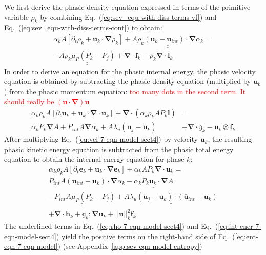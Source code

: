 \documentclass[preprint,10pt]{elsarticle}
\renewcommand{\div}{\mbold{\nabla}\! \cdot \!}
\newcommand{\grad}{\mbold{\nabla}}
\newcommand{\mbold}[1]{\boldsymbol#1}
\newcommand{\eqt}[1]{Eq.~(\ref{#1})}                     %
\newcommand{\app}[1]{Appendix~\ref{#1}}                   %
\newcommand{\tcr}[1]{\textcolor{red}{#1}}
\begin{document}
%
We first derive the phasic density equation expressed in terms of the primitive variable $\rho_k$ by combining \eqt{eq:sev_equ-with-diss-terms-vf} and \eqt{eq:sev_equ-with-diss-terms-cont} to obtain:
%
\begin{multline}\label{eq:rho-7-eqn-model-sect4}
\alpha_k A \left[ \partial_t \rho_k + \mbold u_k  \cdot \grad \rho_k \right] +  \underline{\underline{ A \rho_k \left( \mbold u_k - \mbold u_{int} \right) \cdot \grad \alpha_k}} = \\-\underline{\underline{A \rho_k \mu_P \left( P_k - P_j \right)}} + \div \mbold f_k - \rho_k \div \mbold l_k
\end{multline}
%
In order to derive an equation for the phasic internal energy, the phasic velocity equation is obtained by subtracting the phasic density equation (multiplied by $\mbold u_k$) from the phasic momentum equation:
%
\tcr{too many dots in the second term. It should really be $(\mbold u \cdot \grad) \mbold u$}
\begin{align}\label{eq:vel-7-eqn-model-sect4}
\alpha_k \rho_k  A \left[ \partial_t \mbold u_k + \mbold u_k \cdot \div \mbold u_k \right]  + \div \left( \alpha_k \rho_k A P_k \mathbb{I} \right) &=\nonumber\\
\alpha_k P_k \grad A + P_{int} A \grad \alpha_k + A \lambda_u \left( \mbold u_j - \mbold u_k \right) &+ \div \mathbb{g}_k - \mbold u_k \otimes \mbold f_k
\end{align}
%
After multiplying \eqt{eq:vel-7-eqn-model-sect4} by velocity $\mbold u_k$, the resulting phasic kinetic energy equation is subtracted from the phasic total energy equation to obtain the internal energy equation for phase $k$:
%
\begin{multline}\label{eq:int-ener-7-eqn-model-sect4}
\alpha_k \rho_k  A \left[ \partial_t \mbold e_k + \mbold u_k \cdot \grad \mbold e_k \right]  + \alpha_k A P_k \div \mbold u_k = \\
\underline{\underline{P_{int} A \left(\mbold u_{int}-\mbold u_k \right) \cdot \grad \alpha_k}} -  \underline{\underline{\alpha_k P_k \mbold u_k \cdot \grad A}} \\ 
\underline{\underline{-\bar{P}_{int} A \mu_P \left(P_k-P_j \right)}} + \underline{\underline{A \lambda_u \left(\mbold u_j-\mbold u_k  \right) \cdot \left(\bar{\mbold u}_{int}- \mbold u_k \right)}}\\
+ \div \mbold h_k + \mathbb{g}_k : \grad \mbold u_k + || \mbold u ||^2_k \mbold f_k
\end{multline}
%
The underlined terms in \eqt{eq:rho-7-eqn-model-sect4} and \eqt{eq:int-ener-7-eqn-model-sect4} yield the positive terms on the right-hand side of \eqt{eq:ent-eqn-7-eqn-model} (see \app{app:sev-equ-model-entropy})
\end{document}
